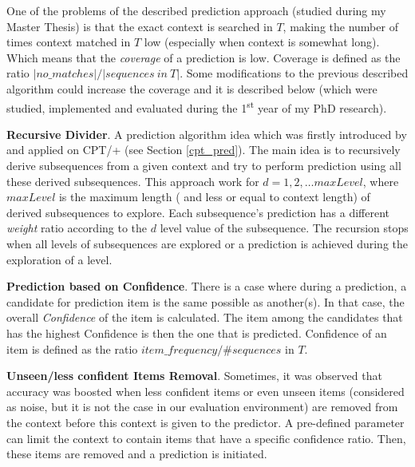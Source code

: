 \par One of the problems of the described prediction approach (studied during my Master Thesis) is that the exact context is searched in $T$, making the number of times context matched in $T$ low (especially when context is somewhat long). Which means that the \emph{coverage} of a prediction is low. Coverage is defined as the ratio \(\vert no\_matches \vert /\vert sequences \ in\ T \vert\). Some modifications to the previous described algorithm could increase the coverage and it is described below (which were studied, implemented and evaluated during the 1\textsuperscript{st} year of my PhD research).

\par \textbf{Recursive Divider}. A prediction algorithm idea which was firstly introduced by \citeauthor{gueniche_fournier-viger_tseng_2013} \citeyear{gueniche_fournier-viger_tseng_2013} and applied on CPT/+ (see Section \ref{cpt_pred}). The main idea is to recursively derive subsequences from a given context and try to perform prediction using all these derived subsequences. This approach work for $d = 1,2,\ldots maxLevel$, where $maxLevel$ is the maximum length ( and less or equal to context length) of derived subsequences to explore. Each subsequence's prediction has a different \emph{weight} ratio according to the $d$ level value of the subsequence. The recursion stops when all levels of subsequences are explored or a prediction is achieved during the exploration of a level.

\par \textbf{Prediction based on Confidence}. There is a case where during a prediction, a candidate for prediction item is the same possible as another(s). In that case, the overall \emph{Confidence} of the item is calculated. The item among the candidates that has the highest Confidence is then the one that is predicted. Confidence of an item is defined as the ratio \(item\_frequency/\#sequences\) in $T$.

\par \textbf{Unseen/less confident Items Removal}. Sometimes, it was observed that accuracy was boosted when less confident items or even unseen items (considered as noise, but it is not the case in our evaluation environment) are removed from the context before this context is given to the predictor. A pre-defined parameter can limit the context to contain items that have a specific confidence ratio. Then, these items are removed and a prediction is initiated. 

